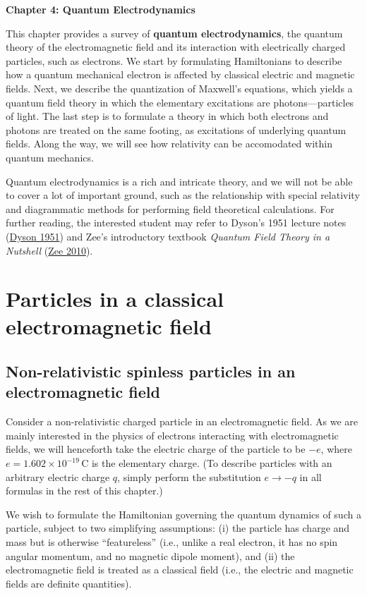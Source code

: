 \documentclass[pra,12pt]{revtex4}
\begin{document}
\begin{center}
{\Large \textbf{Chapter 4: Quantum Electrodynamics}}
\end{center}

This chapter provides a survey of \textbf{quantum electrodynamics},
the quantum theory of the electromagnetic field and its interaction
with electrically charged particles, such as electrons.  We start by
formulating Hamiltonians to describe how a quantum mechanical electron
is affected by classical electric and magnetic fields.  Next, we
describe the quantization of Maxwell's equations, which yields a
quantum field theory in which the elementary excitations are
photons---particles of light.  The last step is to formulate a theory
in which both electrons and photons are treated on the same footing,
as excitations of underlying quantum fields.  Along the way, we will
see how relativity can be accomodated within quantum mechanics.

Quantum electrodynamics is a rich and intricate theory, and we will
not be able to cover a lot of important ground, such as the
relationship with special relativity and diagrammatic methods for
performing field theoretical calculations.  For further reading, the
interested student may refer to Dyson's 1951 lecture notes
(\hyperref[cite:dyson]{Dyson 1951}) and Zee's introductory textbook
\textit{Quantum Field Theory in a Nutshell} (\hyperref[cite:zee]{Zee
  2010}).

\section{Particles in a classical electromagnetic field}

\subsection{Non-relativistic spinless particles in an electromagnetic field}
\label{sec:nonrel}

Consider a non-relativistic charged particle in an electromagnetic
field.  As we are mainly interested in the physics of electrons
interacting with electromagnetic fields, we will henceforth take the
electric charge of the particle to be $-e$, where $e =
1.602\times10^{-19}\,\mathrm{C}$ is the elementary charge.  (To
describe particles with an arbitrary electric charge $q$, simply
perform the substitution $e \rightarrow -q$ in all formulas in the
rest of this chapter.)

We wish to formulate the Hamiltonian governing the quantum dynamics of
such a particle, subject to two simplifying assumptions: (i) the
particle has charge and mass but is otherwise ``featureless'' (i.e.,
unlike a real electron, it has no spin angular momentum, and no
magnetic dipole moment), and (ii) the electromagnetic field is treated
as a classical field (i.e., the electric and magnetic fields are
definite quantities).
\end{document}
